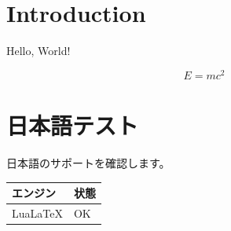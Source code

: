 \documentclass{article}
\begin{document}
\section{Introduction}
Hello, World!

\begin{equation}
  E = mc^2
\end{equation}

\section{日本語テスト}
日本語のサポートを確認します。

\begin{tabular}{ll}
  \toprule
  エンジン & 状態 \\
  \midrule
  LuaLaTeX & OK \\
  \bottomrule
\end{tabular}
\end{document}
